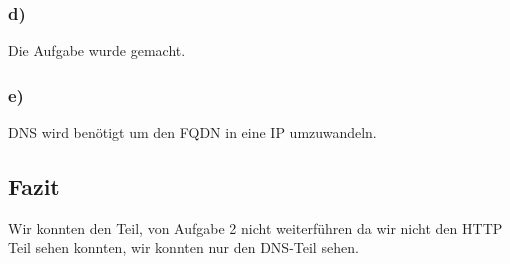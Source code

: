 \subsubsection{d)}
Die Aufgabe wurde gemacht.
\subsubsection{e)}
DNS wird benötigt um den FQDN in eine IP umzuwandeln.

\subsection{Fazit}
Wir konnten den Teil, von Aufgabe 2 nicht weiterführen da wir nicht den HTTP Teil sehen konnten, wir konnten nur den DNS-Teil sehen.